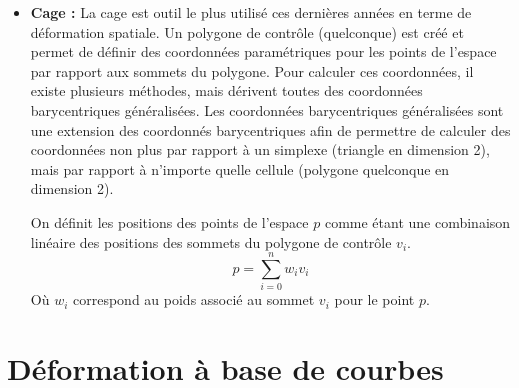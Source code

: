 \begin{itemize}
\item{\textbf{Cage :}} La cage est outil le plus utilisé ces dernières années en
  terme de déformation spatiale. Un polygone de contrôle (quelconque)
  est créé et permet de définir des coordonnées paramétriques pour les
  points de l'espace par rapport aux sommets du polygone. Pour
  calculer ces coordonnées, il existe plusieurs méthodes, mais
  dérivent toutes des coordonnées barycentriques généralisées. Les
  coordonnées barycentriques généralisées sont une extension des
  coordonnés barycentriques afin de permettre de calculer des
  coordonnées non plus par rapport à un simplexe (triangle en dimension
  2), mais par rapport à n'importe quelle cellule (polygone quelconque
  en dimension 2).

  On définit les positions des points de l'espace $p$ comme étant une
  combinaison linéaire des positions des sommets du polygone de
  contrôle $v_i$.
  \begin{equation}
    p = \sum_{i=0}^n w_iv_i
  \end{equation}
  Où $w_i$ correspond au poids associé au sommet $v_i$ pour le point
  $p$.
\end{itemize}

\section{Déformation à base de courbes}

